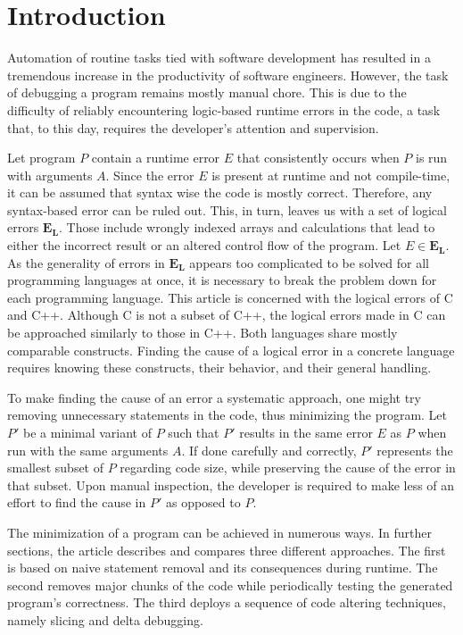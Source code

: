 \documentclass{article}
\begin{document}
\section{Introduction}
Automation of routine tasks tied with software development has resulted in a tremendous
increase in the productivity of software engineers. However, the task of debugging a program
remains mostly manual chore. This is due to the difficulty of reliably encountering logic-based
runtime errors in the code, a task that, to this day, requires the developer's attention and
supervision. \par
Let program $P$ contain a runtime error $E$ that consistently occurs when $P$ is run with arguments $A$. Since the error $E$ is present at runtime and not compile-time, it can be assumed that syntax wise the code is mostly correct. Therefore, any syntax-based error can be ruled out. This, in turn, leaves us with a set of logical errors $\mathbf{E_L}$. Those include wrongly indexed arrays and calculations
that lead to either the incorrect result or an altered control flow of the program. Let $E \in \mathbf{E_L}$. As the generality of errors in $\mathbf{E_L}$ appears too complicated to be solved for all programming languages at once, it is necessary to break the problem down for each programming language. This article is concerned with the logical errors of C and C++. Although C is not a subset of C++, the logical errors made in C can be approached similarly to those in C++. Both languages share mostly comparable constructs. Finding the cause of a logical error in a concrete language requires knowing these constructs, their behavior, and their general handling. \par
To make finding the cause of an error a systematic approach, one might try removing
unnecessary statements in the code, thus minimizing the program. Let $P'$ be a minimal variant of $P$ such that $P'$ results in the same error $E$ as $P$ when run with the same arguments $A$. If done carefully and correctly, $P'$ represents the smallest subset of $P$ regarding code size, while preserving the cause of the error in that subset. Upon manual inspection, the developer is
required to make less of an effort to find the cause in $P'$ as opposed to $P$. \par
The minimization of a program can be achieved in numerous ways. In further sections, the article
describes and compares three different approaches. The first is based on naive statement removal
and its consequences during runtime. The second removes major chunks of the code while
periodically testing the generated program's correctness. The third deploys a sequence of code
altering techniques, namely slicing and delta debugging.
\end{document}
